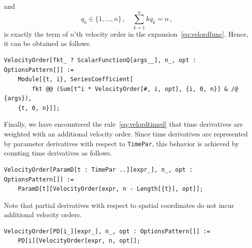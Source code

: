 \documentclass[notitlepage,a4paper,aps,prd,onecolumn,superscriptaddress,nofootinbib,groupedaddress,longbibliography]{revtex4-1}
\begin{document}
and
\begin{equation}
q_k \in \{1, \ldots, n\}\,, \quad
\sum_{k = 1}^{n}kq_k = n\,,
\end{equation}
is exactly the term of $n$'th velocity order in the expansion~\eqref{eq:velordfunc}. Hence, it can be obtained as follows.
\begin{lstlisting}
VelocityOrder[fkt_ ? ScalarFunctionQ[args__], n_, opt : OptionsPattern[]] :=
	Module[{t, i}, SeriesCoefficient[
		fkt @@ (Sum[t^i * VelocityOrder[#, i, opt], {i, 0, n}] & /@ {args}),
	{t, 0, n}]];
\end{lstlisting}
Finally, we have encountered the rule~\eqref{eq:velordtimed} that time derivatives are weighted with an additional velocity order. Since time derivatives are represented by parameter derivatives with respect to \lstinline/TimePar/, this behavior is achieved by counting time derivatives as follows.
\begin{lstlisting}
VelocityOrder[ParamD[t : TimePar ..][expr_], n_, opt : OptionsPattern[]] :=
	ParamD[t][VelocityOrder[expr, n - Length[{t}], opt]];
\end{lstlisting}
Note that partial derivatives with respect to spatial coordinates do not incur additional velocity orders.
\begin{lstlisting}
VelocityOrder[PD[i_][expr_], n_, opt : OptionsPattern[]] :=
	PD[i][VelocityOrder[expr, n, opt]];
\end{lstlisting}


\end{document}
